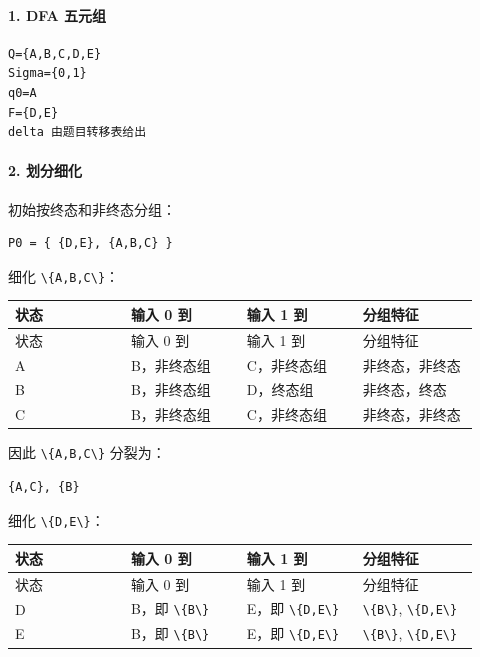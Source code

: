 \documentclass[UTF8]{ctexart}
\begin{document}
\paragraph*{1. DFA 五元组}

\begin{Verbatim}[fontsize=\small,breaklines=true]
Q={A,B,C,D,E}
Sigma={0,1}
q0=A
F={D,E}
delta 由题目转移表给出
\end{Verbatim}

\paragraph*{2. 划分细化}

初始按终态和非终态分组：

\begin{Verbatim}[fontsize=\small,breaklines=true]
P0 = { {D,E}, {A,B,C} }
\end{Verbatim}

细化 \texttt{\textbackslash{}\{A,B,C\textbackslash{}\}}：

\begin{longtable}{|p{0.23\linewidth}|p{0.23\linewidth}|p{0.23\linewidth}|p{0.23\linewidth}|}
\hline
状态 & 输入 0 到 & 输入 1 到 & 分组特征 \\
\hline
\endfirsthead
状态 & 输入 0 到 & 输入 1 到 & 分组特征 \\
\hline
\endhead
A & B，非终态组 & C，非终态组 & 非终态，非终态 \\
\hline
B & B，非终态组 & D，终态组 & 非终态，终态 \\
\hline
C & B，非终态组 & C，非终态组 & 非终态，非终态 \\
\hline
\end{longtable}

因此 \texttt{\textbackslash{}\{A,B,C\textbackslash{}\}} 分裂为：

\begin{Verbatim}[fontsize=\small,breaklines=true]
{A,C}, {B}
\end{Verbatim}

细化 \texttt{\textbackslash{}\{D,E\textbackslash{}\}}：

\begin{longtable}{|p{0.23\linewidth}|p{0.23\linewidth}|p{0.23\linewidth}|p{0.23\linewidth}|}
\hline
状态 & 输入 0 到 & 输入 1 到 & 分组特征 \\
\hline
\endfirsthead
状态 & 输入 0 到 & 输入 1 到 & 分组特征 \\
\hline
\endhead
D & B，即 \texttt{\textbackslash{}\{B\textbackslash{}\}} & E，即 \texttt{\textbackslash{}\{D,E\textbackslash{}\}} & \texttt{\textbackslash{}\{B\textbackslash{}\}}, \texttt{\textbackslash{}\{D,E\textbackslash{}\}} \\
\hline
E & B，即 \texttt{\textbackslash{}\{B\textbackslash{}\}} & E，即 \texttt{\textbackslash{}\{D,E\textbackslash{}\}} & \texttt{\textbackslash{}\{B\textbackslash{}\}}, \texttt{\textbackslash{}\{D,E\textbackslash{}\}} \\
\hline
\end{longtable}
\end{document}
